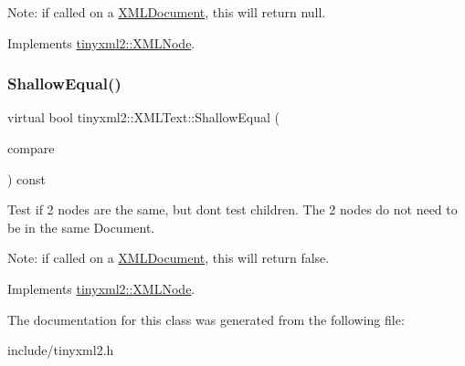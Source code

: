 Note\+: if called on a \mbox{\hyperlink{classtinyxml2_1_1XMLDocument}{X\+M\+L\+Document}}, this will return null. 

Implements \mbox{\hyperlink{classtinyxml2_1_1XMLNode_a8402cbd3129d20e9e6024bbcc0531283}{tinyxml2\+::\+X\+M\+L\+Node}}.

\mbox{\label{classtinyxml2_1_1XMLText_ae0fff8a24e2de7eb073fd192e9db0331}} 
\subsubsection{\texorpdfstring{ShallowEqual()}{ShallowEqual()}}
{\footnotesize\ttfamily virtual bool tinyxml2\+::\+X\+M\+L\+Text\+::\+Shallow\+Equal (\begin{DoxyParamCaption}\item[{const \mbox{\hyperlink{classtinyxml2_1_1XMLNode}{X\+M\+L\+Node}} $\ast$}]{compare }\end{DoxyParamCaption}) const\hspace{0.3cm}{\ttfamily [virtual]}}

Test if 2 nodes are the same, but don\textquotesingle{}t test children. The 2 nodes do not need to be in the same Document.

Note\+: if called on a \mbox{\hyperlink{classtinyxml2_1_1XMLDocument}{X\+M\+L\+Document}}, this will return false. 

Implements \mbox{\hyperlink{classtinyxml2_1_1XMLNode_a7ce18b751c3ea09eac292dca264f9226}{tinyxml2\+::\+X\+M\+L\+Node}}.



The documentation for this class was generated from the following file\+:\begin{DoxyCompactItemize}
\item 
include/tinyxml2.\+h\end{DoxyCompactItemize}
